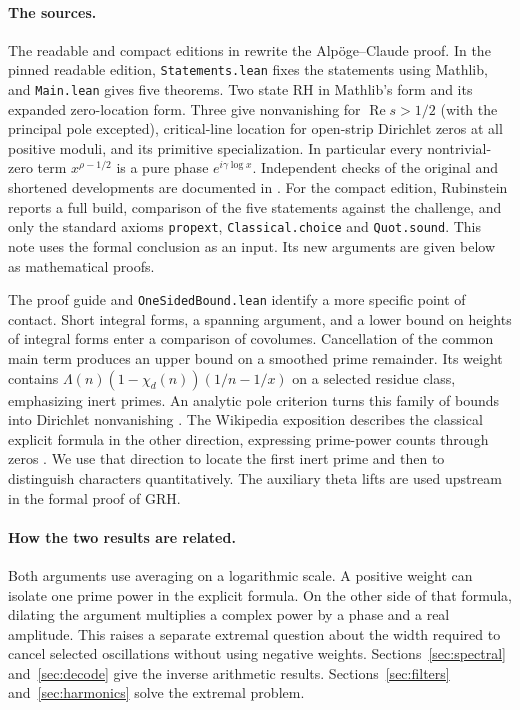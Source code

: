 \documentclass[11pt,letterpaper]{article}
\theoremstyle{remark}\newtheorem{remark}[theorem]{Remark}
\begin{document}
\paragraph{The sources.}
The readable and compact editions in \cite{repo} rewrite the Alp\"oge--Claude proof. In the pinned readable edition, \texttt{Statements.lean} fixes the statements using Mathlib, and \texttt{Main.lean} gives five theorems. Two state RH in Mathlib's form and its expanded zero-location form. Three give nonvanishing for $\operatorname{Re}s>1/2$ (with the principal pole excepted), critical-line location for open-strip Dirichlet zeros at all positive moduli, and its primitive specialization. In particular every nontrivial-zero term $x^{\rho-1/2}$ is a pure phase $e^{i\gamma\log x}$. Independent checks of the original and shortened developments are documented in \cite{lean,rubin}. For the compact edition, Rubinstein reports a full build, comparison of the five statements against the challenge, and only the standard axioms \texttt{propext}, \texttt{Classical.choice} and \texttt{Quot.sound}. This note uses the formal conclusion as an input. Its new arguments are given below as mathematical proofs.

The proof guide and \texttt{OneSidedBound.lean} identify a more specific point of contact. Short integral forms, a spanning argument, and a lower bound on heights of integral forms enter a comparison of covolumes. Cancellation of the common main term produces an upper bound on a smoothed prime remainder. Its weight contains $\Lambda(n)(1-\chi_d(n))(1/n-1/x)$ on a selected residue class, emphasizing inert primes. An analytic pole criterion turns this family of bounds into Dirichlet nonvanishing \cite{repo}. The Wikipedia exposition describes the classical explicit formula in the other direction, expressing prime-power counts through zeros \cite{wiki}. We use that direction to locate the first inert prime and then to distinguish characters quantitatively. The auxiliary theta lifts are used upstream in the formal proof of GRH.

\paragraph{How the two results are related.}
Both arguments use averaging on a logarithmic scale. A positive weight can isolate one prime power in the explicit formula. On the other side of that formula, dilating the argument multiplies a complex power by a phase and a real amplitude. This raises a separate extremal question about the width required to cancel selected oscillations without using negative weights. Sections~\ref{sec:spectral} and~\ref{sec:decode} give the inverse arithmetic results. Sections~\ref{sec:filters} and~\ref{sec:harmonics} solve the extremal problem.
\end{document}
